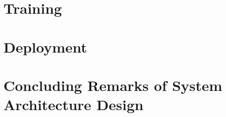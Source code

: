 \section{Training}



\section{Deployment}



\section{Concluding Remarks of System Architecture Design}


